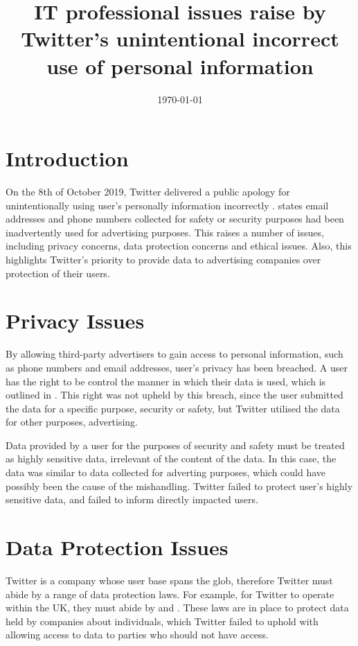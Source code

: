 \documentclass[a4paper, 11pt]{article}
\begin{document}
\title{IT professional issues raise by Twitter's unintentional incorrect use of personal information}
\date{\today}
\maketitle

\section{Introduction}
On the 8th of October 2019, Twitter delivered a public apology for unintentionally using user's personally information incorrectly \parencite{support_twitter_2019}.
\textcite{support_personal_2019} states email addresses and phone numbers collected for safety or security purposes had been inadvertently used for advertising purposes.
This raises a number of issues, including privacy concerns, data protection concerns and ethical issues.
Also, this highlights Twitter's priority to provide data to advertising companies over protection of their users.

\section{Privacy Issues}
By allowing third-party advertisers to gain access to personal information, such as phone numbers and email addresses, user's privacy has been breached.
A user has the right to be control the manner in which their data is used, which is outlined in \textcite{twitter_privacy_2018}.
This right was not upheld by this breach, since the user submitted the data for a specific purpose, security or safety, but Twitter utilised the data for other purposes, advertising.

Data provided by a user for the purposes of security and safety must be treated as highly sensitive data, irrelevant of the content of the data.
In this case, the data was similar to data collected for adverting purposes, which could have possibly been the cause of the mishandling.
Twitter failed to protect user's highly sensitive data, and failed to inform directly impacted users.

\section{Data Protection Issues}
Twitter is a company whose user base spans the glob, therefore Twitter must abide by a range of data protection laws.
For example, for Twitter to operate within the UK, they must abide by \textcite{parliament_of_the_united_kingdom_data_2018} and \textcite{noauthor_regulation_2016}.
These laws are in place to protect data held by companies about individuals, which Twitter failed to uphold with allowing access to data to parties who should not have access.
\end{document}
